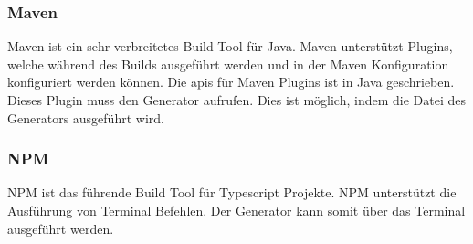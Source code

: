 \documentclass[./einleitung.tex]{subfiles}
\begin{document}
\subsubsection{Maven}
Maven ist ein sehr verbreitetes Build Tool für Java.
Maven unterstützt Plugins, welche während des Builds ausgeführt werden und in der Maven Konfiguration konfiguriert werden können.
Die \acrlong{api}s für Maven Plugins ist in Java geschrieben.
Dieses Plugin muss den Generator aufrufen.
Dies ist möglich, indem die Datei des Generators ausgeführt wird.

\subsubsection{NPM}
NPM ist das führende Build Tool für Typescript Projekte.
NPM unterstützt die Ausführung von Terminal Befehlen.
Der Generator kann somit über das Terminal ausgeführt werden.

\end{document}
